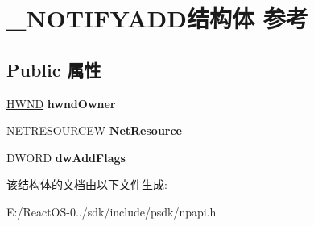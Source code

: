 \hypertarget{struct___n_o_t_i_f_y_a_d_d}{}\section{\+\_\+\+N\+O\+T\+I\+F\+Y\+A\+D\+D结构体 参考}
\label{struct___n_o_t_i_f_y_a_d_d}
\subsection*{Public 属性}
\begin{DoxyCompactItemize}
\item 
\mbox{\label{struct___n_o_t_i_f_y_a_d_d_a3ee86effee7ab651b1c775825b74e83e}} 
\hyperlink{interfacevoid}{H\+W\+ND} {\bfseries hwnd\+Owner}
\item 
\mbox{\label{struct___n_o_t_i_f_y_a_d_d_a66c175310c75fef7c7a579e07e17b791}} 
\hyperlink{struct___n_e_t_r_e_s_o_u_r_c_e_w}{N\+E\+T\+R\+E\+S\+O\+U\+R\+C\+EW} {\bfseries Net\+Resource}
\item 
\mbox{\label{struct___n_o_t_i_f_y_a_d_d_aa738053e6eab410d8d7d6d12247f6ec1}} 
D\+W\+O\+RD {\bfseries dw\+Add\+Flags}
\end{DoxyCompactItemize}


该结构体的文档由以下文件生成\+:\begin{DoxyCompactItemize}
\item 
E\+:/\+React\+O\+S-\/0../sdk/include/psdk/npapi.\+h\end{DoxyCompactItemize}
